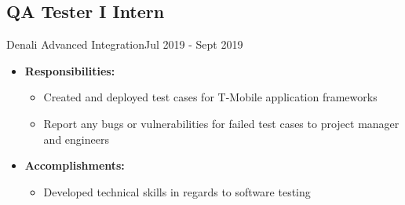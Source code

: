 \subsection{QA Tester I Intern}{Denali Advanced Integration}{Jul 2019 - Sept 2019}
\begin{itemize}
    \item \textbf{Responsibilities:}
    \begin{itemize}
        \item Created and deployed test cases for T-Mobile application frameworks
        \item Report any bugs or vulnerabilities for failed test cases to project manager and engineers  
    \end{itemize}
    \item \textbf{Accomplishments:}
    \begin{itemize}
        \item Developed technical skills in regards to software testing
    \end{itemize}
\end{itemize}
